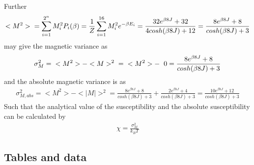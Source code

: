 \documentclass[12pt,english,a4paper]{article}
\begin{document}
Further
\begin{align*}
    <M^2> \hspace{0.2cm} 
          = \sum_{i=1}^{2^n} M_i^2P_i(\beta) 
          = \frac{1}{Z} \sum_{i=1}^{16} M_i^2e^{-\beta E_i}
          = \frac{32e^{\beta 8J} + 32}
                 {4cosh(\beta 8J) + 12}
          = \frac{8e^{\beta 8J} + 8}{cosh(\beta 8J) + 3}
\end{align*}
may give the magnetic variance as
\begin{align*}
    \sigma_M^2 = \hspace{0.2cm} <M^2> - <M>^2 \hspace{0.2cm}
               = \hspace{0.2cm} <M^2> - \hspace{0.2cm} 0
               = \frac{8e^{\beta 8J} + 8}{cosh(\beta 8J) + 3}
\end{align*}
and the absolute magnetic variance is as
\begin{align*}
    \sigma^2_{M,abs} = <M^2> - <|M|>^2 = \frac{8e^{\beta 8J} + 8}{cosh(\beta 8J) + 3}+\frac{2e^{\beta 8J} + 4}{cosh(\beta 8J) + 3}= \frac{10e^{\beta 8J} + 12}{cosh(\beta 8J) + 3}
\end{align*}
Such that the analytical value of the susceptibility and the absolute susceptibility can be calculated by
\begin{align*}
    \chi = \frac{\sigma_M^2}{k_BT}
\end{align*}







\subsection{Tables and data}

\printbibliography
\end{document}
